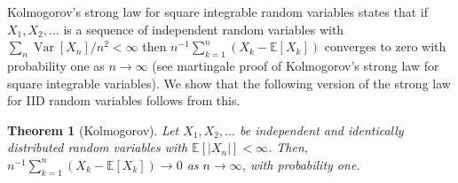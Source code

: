 \documentclass[12pt]{article}
\newtheorem*{theorem*}{Theorem}
\begin{document}
Kolmogorov's strong law for square integrable random variables states that if $X_1,X_2,\ldots$ is a sequence of independent random variables with $\sum_n\operatorname{Var}[X_n]/n^2<\infty$ then $n^{-1}\sum_{k=1}^n(X_k-\mathbb{E}[X_k])$ converges to zero with probability one as $n\rightarrow\infty$ (see martingale proof of Kolmogorov's strong law for square integrable variables).
We show that the following version of the strong law for IID random variables follows from this.

\begin{theorem*}[Kolmogorov]
Let $X_1,X_2,\ldots$ be independent and identically distributed random variables with $\mathbb{E}[|X_n|]<\infty$. Then, $n^{-1}\sum_{k=1}^n(X_k-\mathbb{E}[X_k])\rightarrow 0$ as $n\rightarrow\infty$, with probability one.
\end{theorem*}
\end{document}

